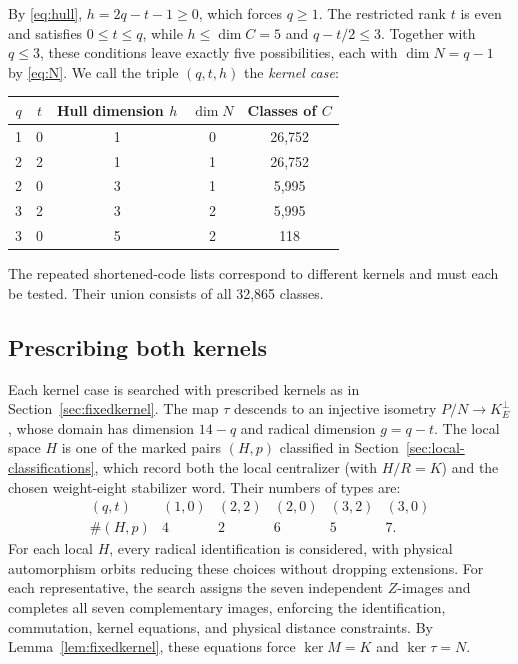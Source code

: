 \documentclass[11pt]{article}
\theoremstyle{definition}
\theoremstyle{remark}
\begin{document}
By \eqref{eq:hull}, \(h=2q-t-1\geq0\), which forces \(q\geq1\). The
restricted rank \(t\) is even and satisfies \(0\leq t\leq q\), while
\(h\leq\dim C=5\) and \(q-t/2\leq3\). Together with \(q\leq3\), these
conditions leave exactly five possibilities, each with \(\dim N=q-1\) by
\eqref{eq:N}. We call the triple \((q,t,h)\) the \emph{kernel case}:
\begin{center}
\begin{tabular}{@{}ccccc@{}}\toprule
\(q\)&\(t\)&Hull dimension \(h\)&\(\dim N\)&Classes of \(C\)\\\midrule
1&0&1&0&26,752\\
2&2&1&1&26,752\\
2&0&3&1&5,995\\
3&2&3&2&5,995\\
3&0&5&2&118\\\bottomrule
\end{tabular}
\end{center}
The repeated shortened-code lists correspond to different kernels and
must each be tested. Their union consists of all 32,865 classes.

\subsection{Prescribing both kernels}

Each kernel case is searched with prescribed kernels as in
Section~\ref{sec:fixedkernel}. The map \(\tau\) descends to an injective
isometry \(P/N\to K^\perp_E\), whose domain has dimension \(14-q\) and
radical dimension \(g=q-t\). The local space \(H\) is one of the marked
pairs \((H,p)\) classified in Section~\ref{sec:local-classifications},
which record both the local centralizer (with \(H/R=K\)) and the chosen
weight-eight stabilizer word. Their numbers of types are:
\[
 \begin{array}{c|ccccc}
 (q,t)&(1,0)&(2,2)&(2,0)&(3,2)&(3,0)\\\hline
 \#(H,p)&4&2&6&5&7.
 \end{array}
\]
For each local \(H\), every radical identification is considered, with
physical automorphism orbits reducing these choices without dropping
extensions. For each representative, the search assigns the seven
independent \(Z\)-images and completes all seven complementary images,
enforcing the identification, commutation, kernel equations, and
physical distance constraints. By Lemma~\ref{lem:fixedkernel}, these
equations force \(\ker M=K\) and \(\ker\tau=N\).
\end{document}
